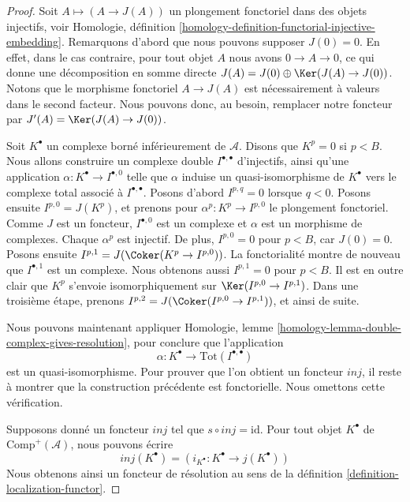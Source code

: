 \begin{proof}
Soit $A \mapsto (A \to J(A))$ un plongement fonctoriel dans des objets
injectifs, voir Homologie, définition
\ref{homology-definition-functorial-injective-embedding}.
Remarquons d'abord que nous pouvons supposer $J(0) = 0$. En effet, dans le cas
contraire, pour tout objet $A$ nous avons $0 \to A \to 0$, ce qui donne une
décomposition en somme directe
$J(A) = J(0) \oplus \Ker(J(A) \to J(0))$.
Notons que le morphisme fonctoriel $A \to J(A)$ est nécessairement à valeurs
dans le second facteur. Nous pouvons donc, au besoin, remplacer notre foncteur
par $J'(A) = \Ker(J(A) \to J(0))$.

\medskip\noindent
Soit $K^\bullet$ un complexe borné inférieurement de $\mathcal{A}$.
Disons que $K^p = 0$ si $p < B$.
Nous allons construire un complexe double $I^{\bullet, \bullet}$ d'injectifs,
ainsi qu'une application $\alpha : K^\bullet \to I^{\bullet, 0}$ telle que
$\alpha$ induise un quasi-isomorphisme de $K^\bullet$ vers le complexe total
associé à $I^{\bullet, \bullet}$.
Posons d'abord $I^{p, q} = 0$ lorsque $q < 0$.
Posons ensuite $I^{p, 0} = J(K^p)$, et prenons pour
$\alpha^p : K^p \to I^{p, 0}$ le plongement fonctoriel. Comme $J$ est un
foncteur, $I^{\bullet, 0}$ est un complexe et $\alpha$ est un morphisme de
complexes. Chaque $\alpha^p$ est injectif. De plus, $I^{p, 0} = 0$ pour
$p < B$, car $J(0) = 0$. Posons ensuite
$I^{p, 1} = J(\Coker(K^p \to I^{p, 0}))$. La fonctorialité montre de nouveau
que $I^{\bullet, 1}$ est un complexe. Nous obtenons aussi
$I^{p, 1} = 0$ pour $p < B$. Il est en outre clair que $K^p$ s'envoie
isomorphiquement sur $\Ker(I^{p, 0} \to I^{p, 1})$.
Dans une troisième étape, prenons
$I^{p, 2} = J(\Coker(I^{p, 0} \to I^{p, 1}))$, et ainsi de suite.

\medskip\noindent
Nous pouvons maintenant appliquer Homologie, lemme
\ref{homology-lemma-double-complex-gives-resolution}, pour conclure que
l'application
$$
\alpha : K^\bullet \longrightarrow \text{Tot}(I^{\bullet, \bullet})
$$
est un quasi-isomorphisme. Pour prouver que l'on obtient un foncteur $inj$, il
reste à montrer que la construction précédente est fonctorielle. Nous omettons
cette vérification.

\medskip\noindent
Supposons donné un foncteur $inj$ tel que $s \circ inj = \text{id}$.
Pour tout objet $K^\bullet$ de $\text{Comp}^{+}(\mathcal{A})$, nous pouvons
écrire
$$
inj(K^\bullet) = (i_{K^\bullet} : K^\bullet \to j(K^\bullet))
$$
Nous obtenons ainsi un foncteur de résolution au sens de la
définition \ref{definition-localization-functor}.
\end{proof}

